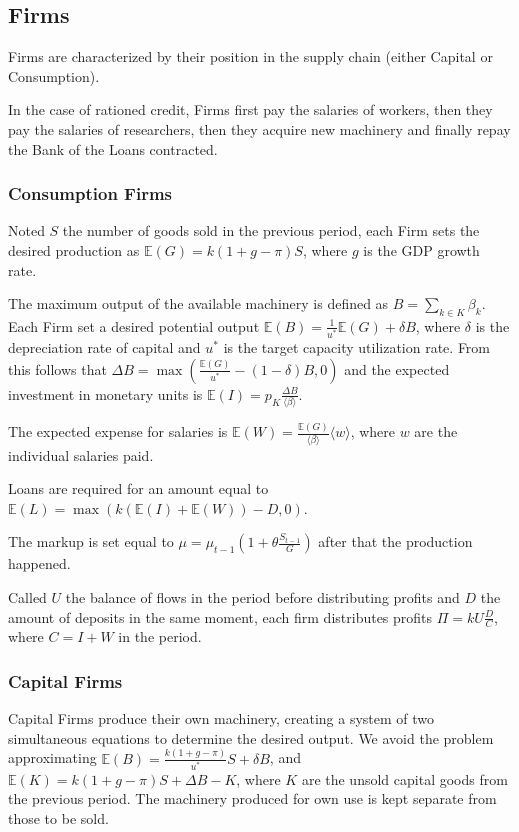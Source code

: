 \documentclass[a4paper, headings=standardclasses]{scrartcl}
\begin{document}
\subsection{Firms}
Firms are characterized by their position in the supply chain (either Capital or Consumption).

In the case of rationed credit, Firms first pay the salaries of workers, then they pay the salaries of researchers, then they acquire new machinery and finally repay the Bank of the Loans contracted.

\subsubsection{Consumption Firms}
Noted $S$ the number of goods sold in the previous period, each Firm sets the desired production as $\mathbb{E}(G) = k(1+g-\pi)S$, where $g$ is the GDP growth rate.

The maximum output of the available machinery is defined as $B = \sum_{k \in K} \beta_k$. Each Firm set a desired potential output $\mathbb{E}(B) = \frac{1}{u^*}\mathbb{E}(G) + \delta B$, where $\delta$ is the depreciation rate of capital and $u^*$ is the target capacity utilization rate. From this follows that $\Delta B = \max(\frac{\mathbb{E}(G)}{u^*} - (1 - \delta) B, 0)$ and the expected investment in monetary units is $\mathbb{E}(I) = p_K\frac{\Delta B}{\langle \beta \rangle}$.

The expected expense for salaries is $\mathbb{E}(W) = \frac{\mathbb{E}(G)}{\langle \beta \rangle}\langle w \rangle$, where $w$ are the individual salaries paid.

Loans are required for an amount equal to $\mathbb{E}(L) = \max(k (\mathbb{E}(I) + \mathbb{E}(W)) - D,0)$.

The markup is set equal to $\mu = \mu_{t-1}(1 + \theta \frac{S_{t-1}}{G})$ after that the production happened.

Called $U$ the balance of flows in the period before distributing profits and $D$ the amount of deposits in the same moment, each firm distributes profits $\Pi = k U \frac{D}{C}$, where $C = I + W$ in the period.


\subsubsection{Capital Firms}
Capital Firms produce their own machinery, creating a system of two simultaneous equations to determine the desired output.
We avoid the problem approximating $\mathbb{E}(B) = \frac{k(1+g-\pi)}{u^*}S + \delta B$, and $\mathbb{E}(K) = k(1+g-\pi)S + \Delta B - K$, where $K$ are the unsold capital goods from the previous period. The machinery produced for own use is kept separate from those to be sold.
\end{document}
